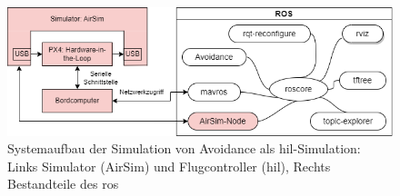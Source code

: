 \begin{figure}[!ht]
    \centering
    \includegraphics[width=\linewidth]{images/simulation_ros-Page-2.drawio.png}
    \caption[Systemaufbau der Simulation von Avoidance als \gls{hil}-Simulation]{Systemaufbau der Simulation von Avoidance als \gls{hil}-Simulation: Links Simulator (AirSim) und Flugcontroller (\gls{hil}), Rechts Bestandteile des \acrshort{ros}}
    \label{fig:system_sim_airsim}
\end{figure}

